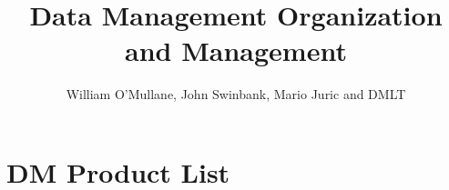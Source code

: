 \documentclass[DM,lsstdraft,SDP,toc]{lsstdoc}
\begin{document}
\title[DM PMP]{Data Management Organization and Management }

\author   {William O'Mullane, John Swinbank, Mario Juric and DMLT}                %
\setDocDate     {\today}              %

%
%

%
%
\maketitle

%
%











\appendix
\section{DM Product List \label{sect:prodlist}}

\newpage



%

\end{document}

